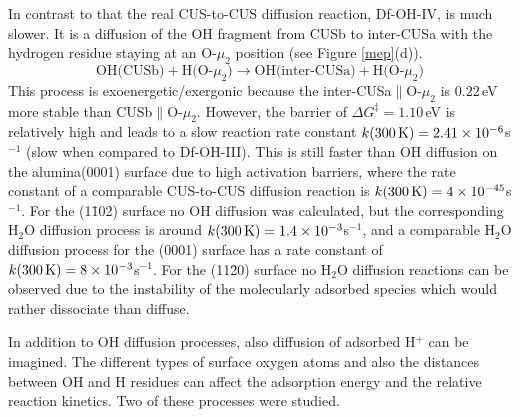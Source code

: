 \documentclass[11pt,DIV=13,BCOR=5mm,a4paper,headinclude]{scrbook}
\begin{document}
In contrast to that the real CUS-to-CUS diffusion reaction, Df-OH-IV, is much slower.
It is a diffusion of the OH fragment from CUSb to inter-CUSa with the hydrogen residue staying at an O-$\mu_2$ position (see Figure \ref{mep}(d)).
\begin{equation}
 \text{OH(CUSb)} + \text{H(O-$\mu_2$)} \rightarrow \text{OH(inter-CUSa)} + \text{H(O-$\mu_2$)} \tag{Df-OH-IV}
     \label{diffOHIV}
\end{equation}
This process is exoenergetic/exergonic because the inter-CUSa$\parallel$O-$\mu_2$ is $0.22\,$eV more stable than CUSb$\parallel$O-$\mu_2$.
However, the barrier of $\Delta G^\ddagger=1.10\,$eV is relatively high and leads to a slow reaction rate constant $k(\textrm{300\,K})=2.41\times 10^{-6}$s$^{-1}$ (slow when compared to Df-OH-III).
This is still faster than OH diffusion on the alumina(0001) surface\cite{WirthJPCC2012,Wirth2014thesis} due to high activation barriers, where the rate constant of a comparable CUS-to-CUS diffusion reaction is $k(\textrm{300\,K})=4\times 10^{-45}$s$^{-1}$.
For the (1\=102) surface no OH diffusion was calculated, but the corresponding H$_2$O diffusion process is around $k(\textrm{300\,K})=1.4\times 10^{-3}$s$^{-1}$, and a comparable H$_2$O diffusion process for the (0001) surface has a rate constant of $k(\textrm{300\,K})=8\times 10^{-3}$s$^{-1}$.
For the (11\=20) surface no H$_2$O diffusion reactions can be observed due to the instability of the molecularly adsorbed species which would rather dissociate than diffuse.


In addition to OH diffusion processes, also diffusion of adsorbed H$^+$ can be imagined.
The different types of surface oxygen atoms and also the distances between OH and H residues can affect the adsorption energy and the relative reaction kinetics.
Two of these processes were studied.
\end{document}

